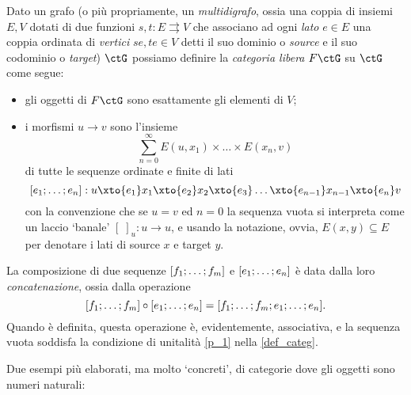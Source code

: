\begin{example}
	Dato un grafo (o più propriamente, un \emph{multidigrafo}, ossia una coppia di insiemi \(E,V\) dotati di due funzioni \(s,t : E\rightrightarrows V\) che associano ad ogni \emph{lato} \(e\in E\) una coppia ordinata di \emph{vertici} \(se,te\in V\) detti il suo dominio o \emph{source} e il suo codominio o \emph{target}) \(\ctG\) possiamo definire la \emph{categoria libera} \(F\ctG\) su \(\ctG\) come segue:
	\begin{itemize}
		\item gli oggetti di \(F\ctG\) sono esattamente gli elementi di \(V\);
		\item i morfismi \(u\to v\) sono l'insieme
		      \[\sum_{n=0}^\infty E(u,x_1)\times\dots\times E(x_n,v)\]
		      di tutte le sequenze ordinate e finite di lati
		      \[ [\tup en;] : u \xto{e_1} x_1 \xto{e_2} x_2\xto{e_3} \dots\xto{e_{n-1}} x_{n-1}\xto{e_n} v\]
		      con la convenzione che se \(u=v\) ed \(n=0\) la sequenza vuota si interpreta come un laccio `banale' \([\;]_u : u\to u\), e usando la notazione, ovvia, \(E(x,y)\subseteq E\) per denotare i lati di source \(x\) e target \(y\).
	\end{itemize}
	La composizione di due sequenze \([\tup fm;]\) e \([\tup en;]\) è data dalla loro \emph{concatenazione}, ossia dalla operazione
	\[[\tup fm;]\circ[\tup en;] = [\tup fm;;\tup en;].\]
	Quando è definita, questa operazione è, evidentemente, associativa, e la sequenza vuota soddisfa la condizione di unitalità \ref{p_1} nella \autoref{def_categ}.
\end{example}
Due esempi più elaborati, ma molto `concreti', di categorie dove gli oggetti sono numeri naturali:
